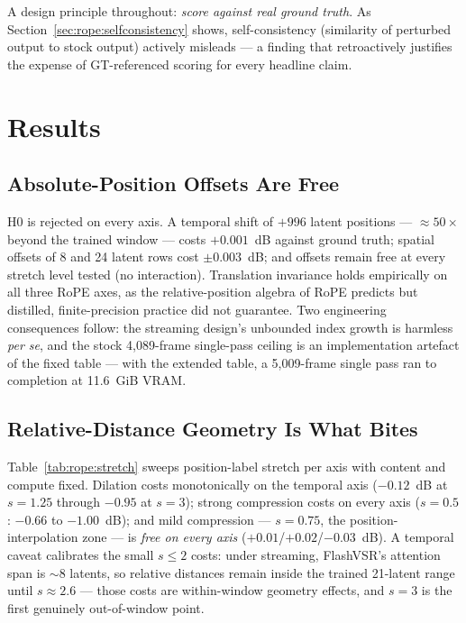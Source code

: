 A design principle throughout: \emph{score against real ground truth}. As
Section~\ref{sec:rope:selfconsistency} shows, self-consistency (similarity of
perturbed output to stock output) actively misleads --- a finding that
retroactively justifies the expense of GT-referenced scoring for every headline
claim.

\section{Results}
\label{sec:rope:results}

\subsection{Absolute-Position Offsets Are Free}
\label{sec:rope:offsets}

H0 is rejected on every axis. A temporal shift of $+996$ latent positions ---
$\approx 50\times$ beyond the trained window --- costs $+0.001$~dB against ground
truth; spatial offsets of 8 and 24 latent rows cost $\pm 0.003$~dB; and offsets
remain free at every stretch level tested (no interaction). Translation
invariance holds empirically on all three RoPE axes, as the relative-position
algebra of RoPE predicts but distilled, finite-precision practice did not
guarantee. Two engineering consequences follow: the streaming design's unbounded
index growth is harmless \emph{per se}, and the stock 4{,}089-frame single-pass
ceiling is an implementation artefact of the fixed table --- with the extended
table, a 5{,}009-frame single pass ran to completion at 11.6~GiB VRAM.

\subsection{Relative-Distance Geometry Is What Bites}
\label{sec:rope:geometry}

Table~\ref{tab:rope:stretch} sweeps position-label stretch per axis with content
and compute fixed. Dilation costs monotonically on the temporal axis
($-0.12$~dB at $s{=}1.25$ through $-0.95$ at $s{=}3$); strong compression costs
on every axis ($s{=}0.5$: $-0.66$ to $-1.00$~dB); and mild compression ---
$s{=}0.75$, the position-interpolation zone --- is \emph{free on every axis}
($+0.01$/$+0.02$/$-0.03$~dB). A temporal caveat calibrates the small $s \leq 2$
costs: under streaming, FlashVSR's attention span is $\sim$8 latents, so relative
distances remain inside the trained 21-latent range until $s \approx 2.6$ ---
those costs are within-window geometry effects, and $s{=}3$ is the first
genuinely out-of-window point.

